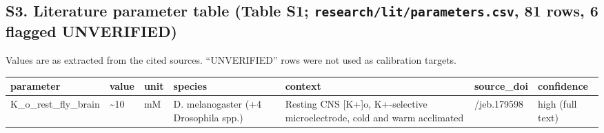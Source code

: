 \documentclass[11pt]{article}
\newcounter{none}
\begin{document}
\subsection{\texorpdfstring{S3. Literature parameter table (Table S1; \texttt{research/lit/parameters.csv}, 81 rows, 6 flagged UNVERIFIED)}{S3. Literature parameter table (Table S1; research/lit/parameters.csv, 81 rows, 6 flagged UNVERIFIED)}}\label{s3.-literature-parameter-table-table-s1-researchlitparameters.csv-81-rows-6-flagged-unverified}

Values are as extracted from the cited sources. ``UNVERIFIED'' rows were not used as calibration targets.

{\def\LTcaptype{none} %
\begin{longtable}[]{@{}
  >{\raggedright\arraybackslash}p{}
  >{\raggedright\arraybackslash}p{}
  >{\raggedright\arraybackslash}p{}
  >{\raggedright\arraybackslash}p{}
  >{\raggedright\arraybackslash}p{}
  >{\raggedright\arraybackslash}p{}
  >{\raggedright\arraybackslash}p{}@{}}
\toprule\noalign{}
\begin{minipage}[b]{\linewidth}\raggedright
parameter
\end{minipage} & \begin{minipage}[b]{\linewidth}\raggedright
value
\end{minipage} & \begin{minipage}[b]{\linewidth}\raggedright
unit
\end{minipage} & \begin{minipage}[b]{\linewidth}\raggedright
species
\end{minipage} & \begin{minipage}[b]{\linewidth}\raggedright
context
\end{minipage} & \begin{minipage}[b]{\linewidth}\raggedright
source\_doi
\end{minipage} & \begin{minipage}[b]{\linewidth}\raggedright
confidence
\end{minipage} \\
\midrule\noalign{}
\endhead
\bottomrule\noalign{}
\endlastfoot
K\_o\_rest\_fly\_brain & \textasciitilde10 & mM & D. melanogaster (+4 Drosophila spp.) & Resting CNS {[}K+{]}o, K+-selective microelectrode, cold and warm acclimated & 10.1242/jeb.179598 & high (full text) \\

\end{longtable}}
\end{document}
